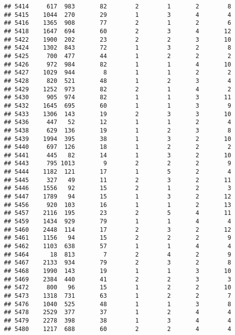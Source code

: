 \documentclass[]{article}
\begin{document}
\begin{verbatim}
## 5414     617  983       82        2        1       2        8
## 5415    1044  270       29        1        3       4        4
## 5416    1365  908       77        2        1       2        6
## 5418    1647  694       60        2        3       4       12
## 5422    1900  202       23        2        2       3       10
## 5424    1302  843       72        1        3       2        8
## 5425     700  477       44        1        2       2        2
## 5426     972  984       82        1        1       4       10
## 5427    1029  944        8        1        1       2        2
## 5428     820  521       48        1        2       3        4
## 5429    1252  973       82        2        1       4        2
## 5430     905  974       82        1        1       3       11
## 5432    1645  695       60        1        1       3        9
## 5433    1306  143       19        2        3       3       10
## 5436     447   52       12        1        1       2        4
## 5438     629  136       19        1        2       3        8
## 5439    1994  395       38        1        3       2       10
## 5440     697  126       18        1        2       2        2
## 5441     445   82       14        1        3       2       10
## 5443     795 1013        9        2        2       2        9
## 5444    1182  121       17        1        5       2        4
## 5445     327   49       11        2        3       2       11
## 5446    1556   92       15        2        1       2        3
## 5447    1789   94       15        1        3       2       12
## 5456     920  103       16        1        1       2       13
## 5457    2116  195       23        2        5       4       11
## 5459    1434  929       79        1        1       4        4
## 5460    2448  114       17        2        3       2       12
## 5461    1156   94       15        2        2       2        9
## 5462    1103  638       57        1        1       4        4
## 5464      18  813        7        2        4       2        9
## 5467    2133  934       79        2        3       2        8
## 5468    1990  143       19        1        1       3       10
## 5469    2384  440       41        2        2       3        3
## 5472     800   96       15        1        2       2       10
## 5473    1318  731       63        1        2       2        7
## 5476    1040  525       48        1        1       3        8
## 5478    2529  377       37        1        2       4        4
## 5479    2278  398       38        1        3       4        4
## 5480    1217  688       60        2        2       4        4

\end{verbatim}
\end{document}
